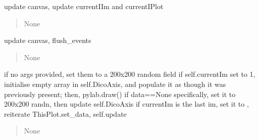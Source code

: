 \documentclass[letterpaper,10pt,english]{sphinxmanual}
\begin{document}
\begin{fulllineitems}
\begin{fulllineitems}
\label{\detokenize{api/killMS.Plot:killMS.Plot.Graph.ClassMplWidget.cla}}
\pysigstartsignatures
{}
\pysigstopsignatures
\sphinxAtStartPar
update canvas, update currentIIm and currentIPlot
\begin{quote}\begin{description}
\sphinxAtStartPar
None

\end{description}\end{quote}

\end{fulllineitems}


\begin{fulllineitems}
\label{\detokenize{api/killMS.Plot:killMS.Plot.Graph.ClassMplWidget.draw}}
\pysigstartsignatures
{}
\pysigstopsignatures
\sphinxAtStartPar
update canvas, flush\_events
\begin{quote}\begin{description}
\sphinxAtStartPar
None

\end{description}\end{quote}

\end{fulllineitems}


\begin{fulllineitems}
\label{\detokenize{api/killMS.Plot:killMS.Plot.Graph.ClassMplWidget.imshow}}
\pysigstartsignatures
{}
\pysigstopsignatures
\sphinxAtStartPar
if no args provided, set them to a 200x200 random field
if self.currentIm set to \sphinxhyphen{}1, initialise empty array in
self.DicoAxis, and populate it as though it was previously
present; then, pylab.draw()
if data==None specifically, set it to 200x200 randn, then update self.DicoAxis
if currentIm is the last im, set it to \sphinxhyphen{}, reiterate
ThisPlot.set\_data, self.update
\begin{quote}\begin{description}
\sphinxAtStartPar
None


\end{description}
\end{quote}
\end{fulllineitems}
\end{fulllineitems}
\end{document}
